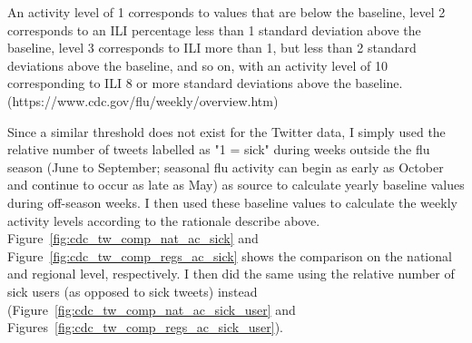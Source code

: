 \documentclass[11pt, a4paper]{article}\usepackage[]{graphicx}\usepackage[]{color}
\begin{document}
An activity level of 1 corresponds to values that are below the baseline, level 2 corresponds to an ILI percentage less than 1 standard deviation above the baseline, level 3 corresponds to ILI more than 1, but less than 2 standard deviations above the baseline, and so on, with an activity level of 10 corresponding to ILI 8 or more standard deviations above the baseline. (https://www.cdc.gov/flu/weekly/overview.htm)\newline
  
Since a similar threshold does not exist for the Twitter data, I simply used the relative number of tweets labelled as "1 = sick" during weeks outside the flu season (June to September; seasonal flu activity can begin as early as October and continue to occur as late as May) as source to calculate yearly baseline values during off-season weeks. I then used these baseline values to calculate the weekly activity levels according to the rationale describe above. Figure~\ref{fig:cdc_tw_comp_nat_ac_sick} and Figure~\ref{fig:cdc_tw_comp_regs_ac_sick} shows the comparison on the national and regional level, respectively. I then did the same using the relative number of sick users (as opposed to sick tweets) instead (Figure~\ref{fig:cdc_tw_comp_nat_ac_sick_user} and Figures~\ref{fig:cdc_tw_comp_regs_ac_sick_user}).
\end{document}
